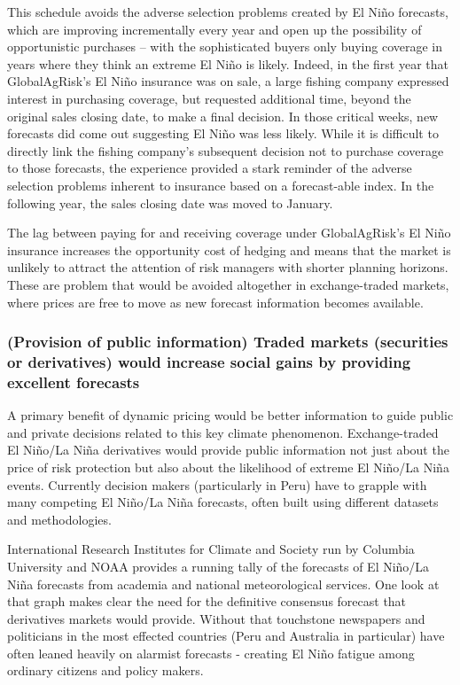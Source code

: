 \documentclass[authoryear]{article}
\begin{document}
This schedule avoids the adverse selection problems created by El Ni\~no forecasts, which are improving incrementally every year and open up the possibility of opportunistic purchases – with the sophisticated buyers only buying coverage in years where they think an extreme El Ni\~no is likely. Indeed, in the first year that GlobalAgRisk’s El Ni\~no insurance was on sale, a large fishing company expressed interest in purchasing coverage, but requested additional time, beyond the original sales closing date, to make a final decision. In those critical weeks, new forecasts did come out suggesting El Ni\~no was less likely. While it is difficult to directly link the fishing company's subsequent decision not to purchase coverage to those forecasts, the experience provided a stark reminder of the adverse selection problems inherent to insurance based on a forecast-able index. In the following year, the sales closing date was moved to January. 

The lag between paying for and receiving coverage under GlobalAgRisk’s El Ni\~no insurance increases the opportunity cost of hedging and means that the market is unlikely to attract the attention of risk managers with shorter planning horizons. These are problem that would be avoided altogether in exchange-traded markets, where prices are free to move as new forecast information becomes available.

\subsubsection{(Provision of public information) Traded markets (securities or derivatives) would increase social gains by providing excellent forecasts} 

A primary benefit of dynamic pricing would be better information to guide public and private decisions related to this key climate phenomenon. Exchange-traded El Ni\~no/La Ni\~na derivatives would provide public information not just about the price of risk protection but also about the likelihood of extreme El Ni\~no/La Ni\~na events. Currently decision makers (particularly in Peru) have to grapple with many competing El Ni\~no/La Ni\~na forecasts, often built using different datasets and methodologies. 

International Research Institutes for Climate and Society run by Columbia University and NOAA provides a running tally of the forecasts of El Ni\~no/La Ni\~na forecasts from academia and national meteorological services. One look at that graph makes clear the need for the definitive consensus forecast that derivatives markets would provide. Without that touchstone newspapers and politicians in the most effected countries (Peru and Australia in particular) have often leaned heavily on alarmist forecasts - creating El Ni\~no fatigue among ordinary citizens and policy makers.
\end{document}
